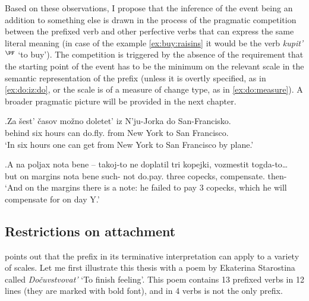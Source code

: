 Based on these observations, I propose that the inference of the event being an addition to something else is drawn in the process of the pragmatic competition between the prefixed verb and other perfective verbs that can express the same literal meaning (in case of the example \ref{ex:buy:raisins} it would be the verb \textit{kupit'$^{\PF}$} `to buy'). The competition is triggered by the absence of the requirement that the starting point of the event has to be the minimum on the relevant scale in the semantic representation of the prefix  (unless it is overtly specified, as in \ref{ex:do:iz:do}, or the scale is of a measure of change type, as in \ref{ex:do:measure}). A broader pragmatic picture will be provided in the next chapter.

\exg.\label{ex:do:iz:do}Za \v{s}est' \v{c}asov mo\v{z}no doletet' iz N'ju-Jorka do San-Francisko.\\
behind six hours can do.fly. from {New York} to {San Francisco}.\\
\trans `In six hours one can get from New York to San Francisco by plane.'\\

\exg.\label{ex:do:measure}A na poljax nota bene -- takoj-to ne doplatil tri kopejki, vozmestit togda-to…\\
but on margins nota bene {} such- not do.pay. three copecks, compensate. then-\\
\trans `And on the margins there is a note: he failed to pay 3 copecks, which he will compensate for on day Y.'

\subsection{Restrictions on attachment}
\citet[236]{Kagan:12} points out that the prefix  in its terminative interpretation can apply to a variety of scales. Let me first illustrate this thesis with a poem by Ekaterina Starostina called \textit{Do\v{c}uvstvovat'} `To finish feeling'. This poem contains 13 prefixed verbs in 12 lines (they are marked with bold font), and in 4 verbs  is not the only prefix.

